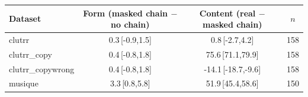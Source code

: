 \begin{tabular}{lccc}
\toprule
Dataset & Form (masked chain $-$ no chain) & Content (real $-$ masked chain) & $n$ \\
\midrule
clutrr & 0.3\,{\scriptsize[-0.9,1.5]} & 0.8\,{\scriptsize[-2.7,4.2]} & 158 \\
clutrr\_copy & 0.4\,{\scriptsize[-0.8,1.8]} & 75.6\,{\scriptsize[71.1,79.9]} & 158 \\
clutrr\_copywrong & 0.4\,{\scriptsize[-0.8,1.8]} & -14.1\,{\scriptsize[-18.7,-9.6]} & 158 \\
musique & 3.3\,{\scriptsize[0.8,5.8]} & 51.9\,{\scriptsize[45.4,58.6]} & 150 \\
\bottomrule
\end{tabular}
